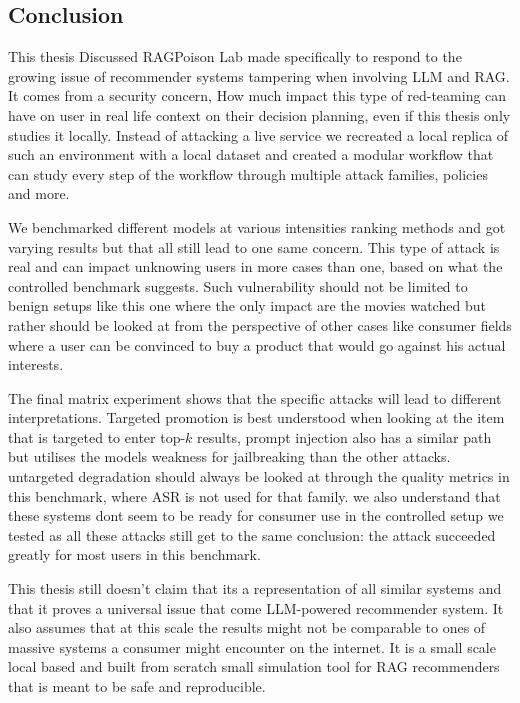 \subsection{Conclusion}

This thesis Discussed RAGPoison Lab made specifically to respond to the growing issue of recommender systems tampering when involving LLM and RAG. It comes from a security concern, How much impact this type of red-teaming can have on user in real life context on their decision planning, even if this thesis only studies it locally. Instead of attacking a live service we recreated a local replica of such an environment with a local dataset and created a modular workflow that can study every step of the workflow through multiple attack families, policies and more\cite{wu2024llmrecsurvey,zhao2024llmrecsystems,gao2024ragsurvey,perez2022redteaming,mazeika2024harmbench,ragpoisonlab_repo}.

We benchmarked different models at various intensities ranking methods and got varying results but that all still lead to one same concern. This type of attack is real and can impact unknowing users in more cases than one, based on what the controlled benchmark suggests. Such vulnerability should not be limited to benign setups like this one where the only impact are the movies watched but rather should be looked at from the perspective of other cases like consumer fields where a user can be convinced to buy a product that would go against his actual interests\cite{nguyen2024manipulatingrecsys,wang2024recpoisonsurvey}.

The final matrix experiment shows that the specific attacks will lead to different interpretations. Targeted promotion is best understood when looking at the item that is targeted to enter top-$k$ results, prompt injection also has a similar path but utilises the models weakness for jailbreaking than the other attacks. untargeted degradation should always be looked at through the quality metrics in this benchmark, where ASR is not used for that family. we also understand that these systems dont seem to be ready for consumer use in the controlled setup we tested as all these attacks still get to the same conclusion: the attack succeeded greatly for most users in this benchmark\cite{ragpoisonlab_repo}. 

This thesis still doesn't claim that its a representation of all similar systems and that it proves a universal issue that come LLM-powered recommender system. It also assumes that at this scale the results might not be comparable to ones of massive systems a consumer might encounter on the internet. It is a small scale local based and built from scratch small simulation tool for RAG recommenders that is meant to be safe and reproducible\cite{harper2015movielens,ragpoisonlab_repo}.

